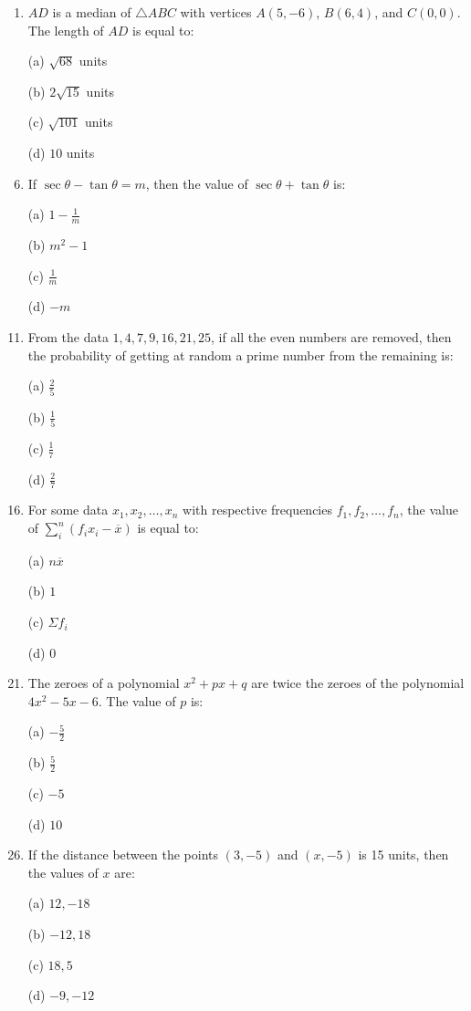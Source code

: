 \documentclass[12pt,-letter paper]{article}
\providecommand{\brak}[1]{\ensuremath{\left(#1\right)}}
\providecommand{\brak}[1]{\ensuremath{\left(#1\right)}}
\begin{document}
\begin{enumerate}
\item $AD$ is a median of $\triangle ABC$ with vertices $A(5, -6)$, $B(6, 4)$, and $C(0, 0)$. The length of $AD$ is equal to:
    \item[(a)] $\sqrt{68}$ units
    \item[(b)] $2\sqrt{15}$ units
    \item[(c)] $\sqrt{101}$ units
    \item[(d)] $10$ units

\item If $\sec\theta - \tan\theta = m$, then the value of $\sec\theta + \tan\theta$ is:
\item[(a)] ${1}-\frac{1}{m}$                                                                                                                                  \item[(b)] $m^2 - 1$
    \item[(c)] $\frac{1}{m}$
    \item[(d)] $-m$

\item From the data $1, 4, 7, 9, 16, 21, 25$, if all the even numbers are removed, then the probability of getting at random a prime number from the remaining is:
    \item[(a)] $\frac{2}{5}$
    \item[(b)] $\frac{1}{5}$
    \item[(c)] $\frac{1}{7}$
    \item[(d)] $\frac{2}{7}$

\item For some data $x_{1}, x_{2}, \dots, x_{n}$ with respective frequencies $f_{1}, f_{2}, \dots, f_{n}$, the value of $\sum_{i}^{n}\brak{ f_{i} x_{i} - \overline{x}}$ is equal to:
    \item[(a)] $n \overline{x}$
    \item[(b)] $1$
    \item[(c)] $\Sigma f_{i}$
    \item[(d)] $0$

\item The zeroes of a polynomial $x^2 + px + q$ are twice the zeroes of the polynomial $4x^2 - 5x - 6$. The value of $p$ is:
    \item[(a)] $-\frac{5}{2}$
    \item[(b)] $\frac{5}{2}$
    \item[(c)] $-5$
    \item[(d)] $10$

\item If the distance between the points $(3, -5)$ and $(x, -5)$ is 15 units, then the values of $x$ are:
    \item[(a)] $12, -18$
    \item[(b)] $-12, 18$
    \item[(c)] $18, 5$
    \item[(d)] $-9, -12$


\end{enumerate}
\end{document}
